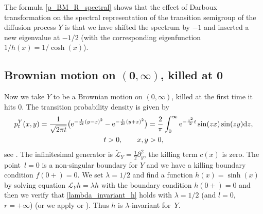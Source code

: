 \documentclass[pdftex]{sigma}
\numberwithin{equation}{section}
\theoremstyle{definition}
\def\L{{\mathcal L}}
\def\d{{\textnormal d}}
\begin{document}
The formula \eqref{p_BM_R_spectral} shows that the effect of Darboux transformation on the spectral representation of the transition semigroup of the diffusion process $Y$ is that we have shifted the spectrum by $-1$ and inserted a new eigenvalue at $-1/2$ (with the corresponding eigenfunction~${1/h(x)=1/\cosh(x)}$).

\subsection[Brownian motion on (0,infty), killed at 0]{Brownian motion on $\boldsymbol{(0,\infty)}$, killed at $\boldsymbol{0}$}\label{example2}

Now we take $Y$ to be a Brownian motion on $(0,\infty)$, killed at the first time it hits $0$. The transition probability density is given by
\begin{gather*}
p_t^Y(x,y)=\frac{1}{\sqrt{2\pi t}} \bigl({\rm e}^{-\frac{1}{2t}(y-x)^2}-{\rm e}^{-\frac{1}{2t}(y+x)^2}\bigr)= \frac{2}{\pi} \int_0^{\infty} {\rm e}^{-\frac{z^2}{2} t}
\sin(z x) \sin(z y) \d z, \\ t>0, \qquad x,y >0,
\end{gather*}
see \cite[p.~120]{Borodin2002}. The infinitesimal generator is $\widetilde \L_Y=\frac{1}{2}\partial_y^2$, the killing term $c(x)$ is zero. The point~${l=0}$
is a non-singular boundary for $Y$ and we have a killing boundary condition $f(0+)=0$. We set $\lambda=1/2$ and find a function $h(x)=\sinh(x)$ by solving equation $\L_Y h= \lambda h$ with the boundary condition $h(0+)=0$ and then we verify that
\eqref{lambda_invariant_h} holds with $\lambda=1/2$ (and $l=0$, $r=+\infty$) (or we apply \cite[Theorem 2.7]{Rogers_2021} or \cite[Corollary 2.2]{Mijatovic_2012}). Thus $h$ is $\lambda$-invariant for~$Y$.
\end{document}
